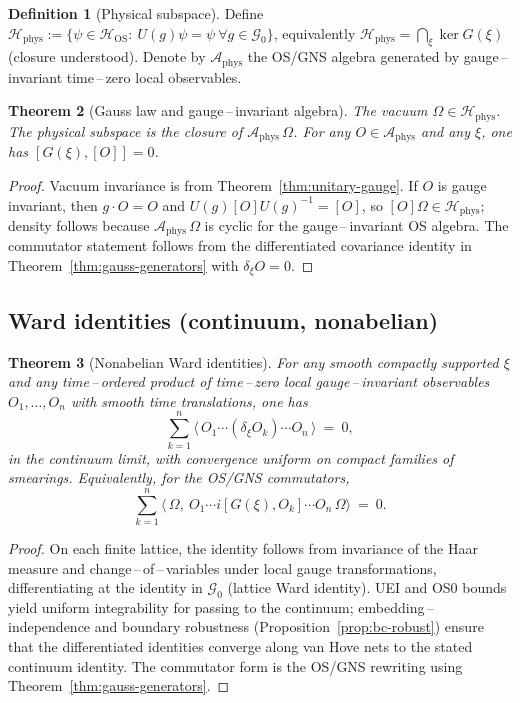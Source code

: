 \documentclass[11pt]{amsart}
\theoremstyle{plain}
\newtheorem{theorem}{Theorem}[section]
\theoremstyle{definition}
\newtheorem{definition}[theorem]{Definition}
\theoremstyle{remark}
\begin{document}
\begin{definition}[Physical subspace]
Define $\mathcal H_{\mathrm{phys}}:=\{\psi\in\mathcal H_{\mathrm{OS}}:\ U(g)\psi=\psi\ \forall g\in\mathcal G_0\}$, equivalently $\mathcal H_{\mathrm{phys}}=\bigcap_{\xi} \ker G(\xi)$ (closure understood). Denote by $\mathcal A_{\mathrm{phys}}$ the OS/GNS algebra generated by gauge\,–\,invariant time\,–\,zero local observables.
\end{definition}

\begin{theorem}[Gauss law and gauge\,–\,invariant algebra]\label{prop:gauss-phys}
The vacuum $\Omega\in\mathcal H_{\mathrm{phys}}$. The physical subspace is the closure of $\mathcal A_{\mathrm{phys}}\,\Omega$. For any $O\in\mathcal A_{\mathrm{phys}}$ and any $\xi$, one has $[G(\xi),[O]]=0$.
\end{theorem}
\begin{proof}
Vacuum invariance is from Theorem~\ref{thm:unitary-gauge}. If $O$ is gauge invariant, then $g\cdot O=O$ and $U(g)[O]U(g)^{-1}=[O]$, so $[O]\Omega\in\mathcal H_{\mathrm{phys}}$; density follows because $\mathcal A_{\mathrm{phys}}\,\Omega$ is cyclic for the gauge\,–\,invariant OS algebra. The commutator statement follows from the differentiated covariance identity in Theorem~\ref{thm:gauss-generators} with $\delta_\xi O=0$.
\end{proof}

\subsection{Ward identities (continuum, nonabelian)}

\begin{theorem}[Nonabelian Ward identities]\label{thm:ward}
For any smooth compactly supported $\xi$ and any time\,–\,ordered product of time\,–\,zero local gauge\,–\,invariant observables $O_1,\dots,O_n$ with smooth time translations, one has
\[
  \sum_{k=1}^n \big\langle\, O_1\cdots (\delta_\xi O_k)\cdots O_n\,\big\rangle\ =\ 0,
\]
in the continuum limit, with convergence uniform on compact families of smearings. Equivalently, for the OS/GNS commutators,
\[
  \sum_{k=1}^n \langle\,\Omega,\ O_1\cdots i[ G(\xi), O_k ]\cdots O_n\,\Omega\rangle\ =\ 0.
\]
\end{theorem}
\begin{proof}
On each finite lattice, the identity follows from invariance of the Haar measure and change\,–\,of\,–\,variables under local gauge transformations, differentiating at the identity in $\mathcal G_0$ (lattice Ward identity). UEI and OS0 bounds yield uniform integrability for passing to the continuum; embedding\,–\,independence and boundary robustness (Proposition~\ref{prop:bc-robust}) ensure that the differentiated identities converge along van Hove nets to the stated continuum identity. The commutator form is the OS/GNS rewriting using Theorem~\ref{thm:gauss-generators}.
\end{proof}
\end{document}
